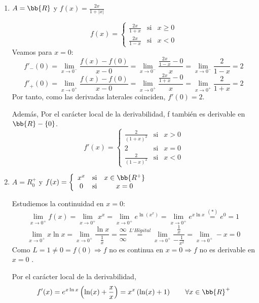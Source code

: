 \begin{ejercicio}
\begin{enumerate}
    \item $A=\bb{R}$ y $f(x)=\frac{2x}{1+|x|}$
    \label{Ejercicio:1.3}

    $$f(x)=\left\{
    \begin{array}{ccc}
    \displaystyle \frac{2x}{1+x} & \text{si} & x\geq 0 \\
    \displaystyle \frac{2x}{1-x} & \text{si} & x<0
    \end{array}\right.$$
    Veamos para $x=0$:
    \begin{equation*}
        f'_-(0) = \lim_{x\to 0^-} \frac{f(x)-f(0)}{x-0} = \lim_{x\to 0^-} \frac{\frac{2x}{1-x}-0}{x} = \lim_{x\to 0^-} \frac{2}{1-x} = 2
    \end{equation*}
    \begin{equation*}
        f'_+(0) = \lim_{x\to 0^+} \frac{f(x)-f(0)}{x-0} = \lim_{x\to 0^+} \frac{\frac{2x}{1+x}-0}{x} = \lim_{x\to 0^+} \frac{2}{1+x} = 2
    \end{equation*}
    Por tanto, como las derivadas laterales coinciden, $f'(0)=2$.

    Además, Por el carácter local de la derivabilidad, f también es derivable en $\bb{R}-\{0\}$.
    $$f'(x)=\left\{
    \begin{array}{ccc}
    \displaystyle \frac{2}{(1+x)^2} & \text{si} & x> 0 \\
    2 & \text{si} & x= 0 \\
    \displaystyle \frac{2}{(1-x)^2} & \text{si} & x<0
    \end{array}\right.$$

    \item $A=R^+_0$ y $f(x)=\left\{
    \begin{array}{ccc}
    x^x & \text{si} & x\in \bb{R^+} \\
    0 & \text{si} & x=0
    \end{array}\right.$
    
    Estudiemos la continuidad en $x=0$:
    \begin{equation*}
        \lim_{x\to 0^+}f(x)=\lim_{x\to 0^+}x^x = \lim_{x\to 0^+}e^{\ln(x^x)} = \lim_{x\to 0^+} e^{x\ln{x}} \stackrel{(\ast)}{=} e^0 = 1
    \end{equation*}
    \begin{equation*}
        \lim_{x\to 0^+}x \ln{x} = \lim_{x\to 0^+} \frac{\ln{x}}{\frac{1}{x}} = \frac{\infty}{\infty} \stackrel{L'H\hat{o}pital}{=} \lim_{x\to 0^+} \frac{\frac{1}{x}}{-\frac{1}{x^2}} = \lim_{x\to 0^+} - x = 0
    \end{equation*}
    Como $L=1 \neq 0 = f(0) \Longrightarrow f$ no es continua en $x=0 \Longrightarrow f$ no es derivable en $x=0$ .

    Por el carácter local de la derivabilidad,
    $$f'(x) = e^{x\ln{x}} \left(\ln(x)+\frac{x}{x}\right) = x^x \left(\ln(x)+1\right) \qquad \forall x\in \bb{R}^+$$
\end{enumerate}
\end{ejercicio}

